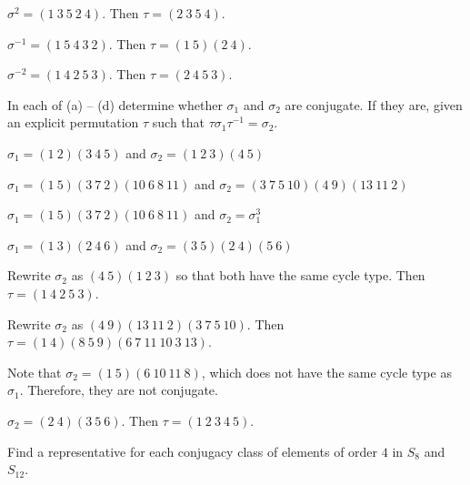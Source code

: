 \begin{solalph}
	\item $\sigma^2 = (1\ 3\ 5\ 2\ 4)$. Then $\tau = (2\ 3\ 5\ 4)$.
	\item $\sigma^{-1} = (1\ 5\ 4\ 3\ 2)$. Then $\tau = (1\ 5)(2\ 4)$.
	\item $\sigma^{-2} = (1\ 4\ 2\ 5\ 3)$. Then $\tau = (2\ 4\ 5\ 3)$.
\end{solalph}

\begin{exercise}
	In each of (a) -- (d) determine whether $\sigma_1$ and $\sigma_2$ are conjugate. If they are, given an explicit permutation $\tau$ such that $\tau \sigma_1 \tau^{-1} = \sigma_2$.
	\begin{subproblems}
		\item $\sigma_1 = (1\ 2)(3\ 4\ 5)$ and $\sigma_2 = (1\ 2\ 3)(4\ 5)$
		\item $\sigma_1 = (1\ 5)(3\ 7\ 2)(10\ 6\ 8\ 11)$ and $\sigma_2 = (3\ 7\ 5\ 10)(4\ 9)(13\ 11\ 2)$
		\item $\sigma_1 = (1\ 5)(3\ 7\ 2)(10\ 6\ 8\ 11)$ and $\sigma_2 = \sigma_1^3$
		\item $\sigma_1 = (1\ 3)(2\ 4\ 6)$ and $\sigma_2 = (3\ 5)(2\ 4)(5\ 6)$
	\end{subproblems}
\end{exercise}

\begin{solalph}
	\item Rewrite $\sigma_2$ as $(4\ 5)(1\ 2\ 3)$ so that both have the same cycle type. Then $\tau = (1\ 4\ 2\ 5\ 3)$.
	\item Rewrite $\sigma_2$ as $(4\ 9)(13\ 11\ 2)(3\ 7\ 5\ 10)$. Then $\tau = (1\ 4)(8\ 5\ 9)(6\ 7\ 11\ 10\ 3\ 13)$.
	\item Note that $\sigma_2 = (1\ 5)(6\ 10\ 11\ 8)$, which does not have the same cycle type as $\sigma_1$. Therefore, they are not conjugate.
	\item $\sigma_2 = (2\ 4)(3\ 5\ 6)$. Then $\tau = (1\ 2\ 3\ 4\ 5)$.
\end{solalph}

\begin{exercise}
	Find a representative for each conjugacy class of elements of order $4$ in $S_8$ and $S_{12}$.
\end{exercise}


